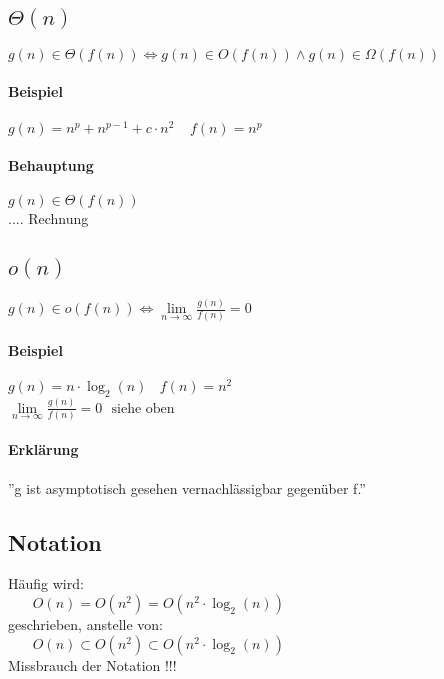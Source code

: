 \subsection{$\Theta(n)$}
$g(n) \in \Theta(f(n)) \Leftrightarrow g(n) \in O(f(n)) \land g(n) \in \Omega(f(n))$
\paragraph{Beispiel} $g(n) = n^p + n^{p-1} + c \cdot n^2~~~~~f(n) = n^p$
\paragraph{Behauptung} $g(n) \in \Theta(f(n))$ \\
.... Rechnung

\subsection{$o(n)$}

$g(n) \in o(f(n)) \Leftrightarrow \lim\limits_{n \rightarrow \infty}{\frac{g(n)}{f(n)}} = 0$
\paragraph{Beispiel} $g(n) = n \cdot \log_2(n)~~~~f(n) = n^2$\\
$\lim\limits_{n \rightarrow \infty}{\frac{g(n)}{f(n)}} = 0~~~\text{siehe oben}$\\
\paragraph{Erklärung} ''g ist asymptotisch gesehen vernachlässigbar gegenüber f.''

\pagebreak


\begin{mdframed}
\subsection{Notation}
Häufig wird:\\
$~~~~~~~~O(n) = O(n^2) = O(n^2 \cdot \log_2(n))$ \\
geschrieben, anstelle von:\\
$~~~~~~~~O(n) \subset O(n^2) \subset O(n^2 \cdot \log_2(n))$ \\
Missbrauch der Notation !!!\\

\end{mdframed}


